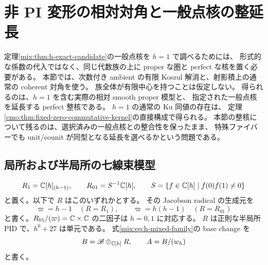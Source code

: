 \section{非 PI 変形の相対対角と一般点核の整延長}
\label{mix:sec:kernel-specialization}

定理\ref{mix:thm:h-exact-candidate}の一般点核を $h=1$ で調べるためには、
形式的な係数の代入ではなく、同じ代数族の上に proper な圏と perfect な核を置く必要がある。
本節では、次数付き ambient の有限 Koszul 解消と、射影積上の通常の coherent 対角を使う。
族全体が有限中心を持つことは仮定しない。
得られるのは、$h=1$ を含む実際の相対 smooth proper 模型と、
指定された一般点核を延長する perfect 整核である。
$h=1$ の通常の Ku 同値の存在は、
定理\ref{cmo:thm:fixed-zero-commutative-kernel}の直接構成で得られる。
本節の整核について残るのは、選択済みの一般点核との整合性を保ったまま、
特殊ファイバーでも unit/counit が同型となる延長を選べるかという問題である。

\subsection{局所および半局所の七線束模型}

\[
 R_1=\mathbb C[h]_{(h-1)},\qquad
 R_{01}=S^{-1}\mathbb C[h],\qquad
 S=\{f\in\mathbb C[h]\mid f(0)f(1)\ne0\}
\]
と置く。以下で $R$ はこのいずれかとする。
その Jacobson radical の生成元を
\[
 \varpi=h-1\quad(R=R_1),\qquad
 \varpi=h(h-1)\quad(R=R_{01})
\]
と書く。$R_{01}/(\varpi)=\mathbb C\times\mathbb C$ の二因子は $h=0,1$ に対応する。
$R$ は正則な半局所 PID で、$h^6+27$ は単元である。
式\eqref{mix:eq:h-mixed-family}の base change を
\[
 B=\mathscr B\otimes_{\mathbb C[h]}R,\qquad A=B/(w_h)
\]
と書く。


